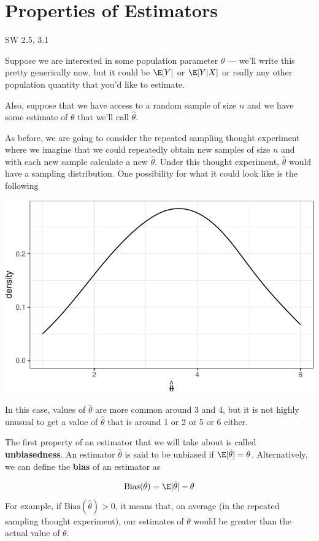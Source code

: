 \documentclass[
  letterpaper,
  DIV=11,
  numbers=noendperiod]{scrreprt}
\begin{document}
\section{Properties of Estimators}\label{properties-of-estimators-1}

SW 2.5, 3.1

Suppose we are interested in some population parameter \(\theta\) ---
we'll write this pretty generically now, but it could be \(\E[Y]\) or
\(\E[Y|X]\) or really any other population quantity that you'd like to
estimate.

Also, suppose that we have access to a random sample of size \(n\) and
we have some estimate of \(\theta\) that we'll call \(\hat{\theta}\).

As before, we are going to consider the repeated sampling thought
experiment where we imagine that we could repeatedly obtain new samples
of size \(n\) and with each new sample calculate a new \(\hat{\theta}\).
Under this thought experiment, \(\hat{\theta}\) would have a sampling
distribution. One possibility for what it could look like is the
following

\includegraphics{05-finite_sample_properties_files/figure-pdf/unnamed-chunk-1-1.pdf}

In this case, values of \(\hat{\theta}\) are more common around 3 and 4,
but it is not highly unusual to get a value of \(\hat{\theta}\) that is
around 1 or 2 or 5 or 6 either.

The first property of an estimator that we will take about is called
\textbf{unbiasedness}. An estimator \(\hat{\theta}\) is said to be
unbiased if \(\E[\hat{\theta}] = \theta\). Alternatively, we can define
the \textbf{bias} of an estimator as

\[
  \textrm{Bias}(\hat{\theta}) = \E[\hat{\theta}] - \theta
\] For example, if \(\textrm{Bias}(\hat{\theta}) > 0\), it means that,
on average (in the repeated sampling thought experiment), our estimates
of \(\theta\) would be greater than the actual value of \(\theta\).
\end{document}
